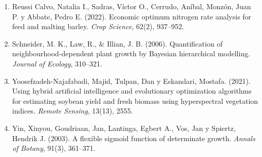 \documentclass[
11pt, %
]{charter}
\begin{document}
\begin{enumerate}
    \item Reussi Calvo, Natalia I., Sadras, Víctor O., Cerrudo, Aníbal, Monzón, Juan P. y Abbate, Pedro E. (2022). Economic optimum nitrogen rate analysis for feed and malting barley. \emph{Crop Science}, 62(2), 937–952.

    \item Schneider, M. K., Law, R., \& Illian, J. B. (2006). Quantification of neighbourhood-dependent plant growth by Bayesian hierarchical modelling. \emph{Journal of Ecology}, 310–321.

    \item Yoosefzadeh-Najafabadi, Majid, Tulpan, Dan y Eskandari, Mostafa. (2021). Using hybrid artificial intelligence and evolutionary optimization algorithms for estimating soybean yield and fresh biomass using hyperspectral vegetation indices. \emph{Remote Sensing}, 13(13), 2555.

    \item Yin, Xinyou, Goudriaan, Jan, Lantinga, Egbert A., Vos, Jan y Spiertz, Hendrik J. (2003). A flexible sigmoid function of determinate growth. \emph{Annals of Botany}, 91(3), 361–371.

\end{enumerate}
\end{document}
